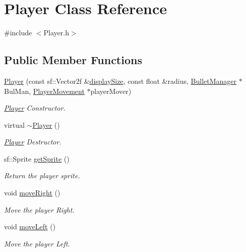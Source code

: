 \hypertarget{class_player}{}\section{Player Class Reference}
\label{class_player}


{\ttfamily \#include $<$Player.\+h$>$}

\subsection*{Public Member Functions}
\begin{DoxyCompactItemize}
\item 
\hyperlink{class_player_a73caf03d79f04f53fe9d799bb5123c37}{Player} (const sf\+::\+Vector2f \&\hyperlink{_game_tests_8cpp_ac0230399c621da4679687e37351dba76}{display\+Size}, const float \&radius, \hyperlink{class_bullet_manager}{Bullet\+Manager} $\ast$Bul\+Man, \hyperlink{class_player_movement}{Player\+Movement} $\ast$player\+Mover)
\begin{DoxyCompactList}\small\item\em \hyperlink{class_player}{Player} Constructor. \end{DoxyCompactList}\item 
virtual \hyperlink{class_player_a749d2c00e1fe0f5c2746f7505a58c062}{$\sim$\+Player} ()
\begin{DoxyCompactList}\small\item\em \hyperlink{class_player}{Player} Destructor. \end{DoxyCompactList}\item 
sf\+::\+Sprite \hyperlink{class_player_aabef659f696be314cdb705a1ce77ec2a}{get\+Sprite} ()
\begin{DoxyCompactList}\small\item\em Return the player sprite. \end{DoxyCompactList}\item 
void \hyperlink{class_player_a6a2b68bc4b21d4c4a79a23b498896ec2}{move\+Right} ()
\begin{DoxyCompactList}\small\item\em Move the player Right. \end{DoxyCompactList}\item 
void \hyperlink{class_player_ae3bbcf1159bdc059bff1c2513f2505f7}{move\+Left} ()
\begin{DoxyCompactList}\small\item\em Move the player Left. \end{DoxyCompactList}\item 

\end{DoxyCompactItemize}
